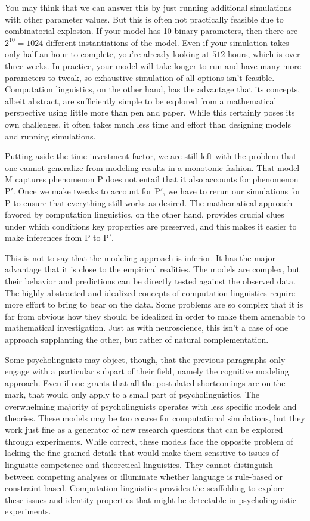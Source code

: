 You may think that we can answer this by just running additional simulations with other parameter values.
But this is often not practically feasible due to combinatorial explosion.
If your model has 10 binary parameters, then there are $2^{10} = 1024$ different instantiations of the model.
Even if your simulation takes only half an hour to complete, you're already looking at $512$ hours, which is over three weeks.
In practice, your model will take longer to run and have many more parameters to tweak, so exhaustive simulation of all options isn't feasible.
Computation linguistics, on the other hand, has the advantage that its concepts, albeit abstract, are sufficiently simple to be explored from a mathematical perspective using little more than pen and paper.
While this certainly poses its own challenges, it often takes much less time and effort than designing models and running simulations.

Putting aside the time investment factor, we are still left with the problem that one cannot generalize from modeling results in a monotonic fashion.
That model M captures phenomenon P does not entail that it also accounts for phenomenon P$'$.
Once we make tweaks to account for P$'$, we have to rerun our simulations for P to ensure that everything still works as desired.
The mathematical approach favored by computation linguistics, on the other hand, provides crucial clues under which conditions key properties are preserved, and this makes it easier to make inferences from P to P$'$.

This is not to say that the modeling approach is inferior.
It has the major advantage that it is close to the empirical realities.
The models are complex, but their behavior and predictions can be directly tested against the observed data.
The highly abstracted and idealized concepts of computation linguistics require more effort to bring to bear on the data.
Some problems are so complex that it is far from obvious how they should be idealized in order to make them amenable to mathematical investigation.
Just as with neuroscience, this isn't a case of one approach supplanting the other, but rather of natural complementation.

Some psycholinguists may object, though, that the previous paragraphs only engage with a particular subpart of their field, namely the cognitive modeling approach.
Even if one grants that all the postulated shortcomings are on the mark, that would only apply to a small part of psycholinguistics.
The overwhelming majority of psycholinguists operates with less specific models and theories.
These models may be too coarse for computational simulations, but they work just fine as a generator of new research questions that can be explored through experiments.
While correct, these models face the opposite problem of lacking the fine-grained details that would make them sensitive to issues of linguistic competence and theoretical linguistics.
They cannot distinguish between competing analyses or illuminate whether language is rule-based or constraint-based.
Computation linguistics provides the scaffolding to explore these issues and identity properties that might be detectable in psycholinguistic experiments.

